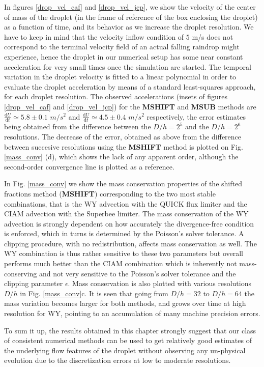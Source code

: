 In figures \ref{drop_vel_caf} and \ref{drop_vel_jcp}, 
we show the velocity of the center of mass of the droplet 
(in the frame of reference of the box enclosing the droplet) 
as a function of time, and its behavior as we increase the droplet resolution. 
We have to keep in mind that the velocity inflow condition 
of $5$ m/s does not correspond to the terminal velocity 
field of an actual falling raindrop might experience, 
hence the droplet in our numerical setup has some 
near constant acceleration for very small times once the simulation are started.
The temporal variation in the droplet velocity is fitted to a 
linear polynomial in order to evaluate the droplet acceleration 
by means of a standard least-squares approach, for each droplet resolution. 
The observed accelerations (insets of figures \ref{drop_vel_caf} and \ref{drop_vel_jcp})
for the \textbf{MSHIFT} and \textbf{MSUB} methods are 
$\frac{\textrm{d}U}{\textrm{d}t} \simeq 5.8 \pm 0.1$ $m/s^2$
and $\frac{\textrm{d}U}{\textrm{d}t} \simeq 4.5 \pm 0.4$ $m/s^2$
respectively, the error estimates being obtained from the difference
between the $D/h = 2^5$ and the $D/h = 2^6$ resolutions.
The decrease of the error, obtained as above from the
difference between succesive resolutions using the \textbf{MSHIFT} method 
is plotted on Fig. \ref{mass_conv} (d), which shows the lack of any apparent 
order, although the second-order convergence line is plotted as a reference.

In Fig. \ref{mass_conv} we show the mass conservation properties 
of the shifted fractions method (\textbf{MSHIFT}) corresponding to the two most 
stable combinations, that is the WY advection with the QUICK 
flux limiter and the CIAM advection with the Superbee limiter. 
The mass conservation of the WY advection is strongly dependent
on how accurately the divergence-free condition is enforced, which
in turns is determined by the Poisson's solver tolerance. 
A clipping procedure, with no redistribution, affects mass conservation as well.
The WY combination is thus rather sensitive to these two parameters
but overall performs much better than the CIAM combination which is
inherently not mass-conserving and not very sensitive to the Poisson's solver 
tolerance and the clipping parameter $\epsilon$.
Mass conservation is also plotted with various 
resolutions $D/h$ in Fig. \ref{mass_conv}c. 
It is seen that going from $D/h=32$ to $D/h=64$
the mass variation becomes larger for both methods, and grows over time at 
high resolution for WY, pointing to an accumulation of many machine precision errors.

To sum it up, the results obtained in this chapter strongly suggest that 
our class of consistent numerical methods can be used to get relatively good 
estimates of the underlying flow features of the droplet without observing 
any un-physical evolution due to the discretization errors at low to moderate resolutions.           


